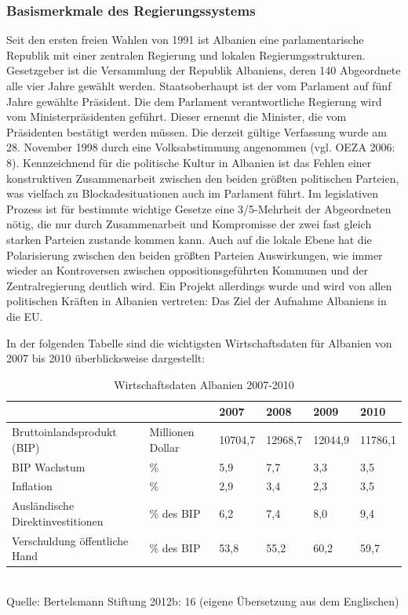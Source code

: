 \subsubsection{Basismerkmale des Regierungssystems}
Seit den ersten freien Wahlen von 1991 ist Albanien eine parlamentarische Republik mit einer zentralen Regierung und lokalen Regierungsstrukturen. Gesetzgeber ist die Versammlung der Republik Albaniens, deren 140 Abgeordnete alle vier Jahre gewählt werden. Staatsoberhaupt ist der vom Parlament auf fünf Jahre gewählte Präsident. Die dem Parlament verantwortliche Regierung wird vom Ministerpräsidenten geführt. Dieser ernennt die Minister, die vom Präsidenten bestätigt werden müssen. Die derzeit gültige Verfassung wurde am 28. November 1998 durch eine Volksabstimmung angenommen (vgl. OEZA 2006: 8). Kennzeichnend für die politische Kultur in Albanien ist das Fehlen einer konstruktiven Zusammenarbeit zwischen den beiden größten politischen Parteien, was vielfach zu Blockadesituationen auch im Parlament führt. Im legislativen Prozess ist für bestimmte wichtige Gesetze eine 3/5-Mehrheit der Abgeordneten nötig, die nur durch Zusammenarbeit und Kompromisse der zwei fast gleich starken Parteien zustande kommen kann. Auch auf die lokale Ebene hat die Polarisierung zwischen den beiden größten Parteien Auswirkungen, wie immer wieder an Kontroversen zwischen oppositionsgeführten Kommunen und der Zentralregierung deutlich wird. Ein Projekt allerdings wurde und wird von allen politischen Kräften in Albanien vertreten: Das Ziel der Aufnahme Albaniens in die EU.\par
In der folgenden Tabelle sind die wichtigsten Wirtschaftsdaten für Albanien von 2007 bis 2010 überblicksweise dargestellt:
\begin{table}[H]
\caption{Wirtschaftsdaten Albanien 2007-2010}
\small{
\begin{tabular}{|R{46mm}|R{25mm}|R{15mm}|R{15mm}|R{15mm}|R{15mm}|}\hline
&&2007&2008&2009&2010\\\hline
Bruttoinlandsprodukt (BIP)&
Millionen Dollar&10704,7&12968,7&12044,9&11786,1\\\hline
BIP Wachstum&\%&5,9&7,7&3,3&3,5\\\hline
Inflation &\%&2,9&3,4&2,3&3,5\\\hline
Ausländische Direktinvestitionen &\% des BIP&6,2&7,4&8,0&9,4\\\hline
Verschuldung öffentliche Hand&\% des BIP&53,8&55,2&60,2&59,7\\\hline
\end{tabular}\\
Quelle: Bertelsmann Stiftung 2012b: 16 (eigene Übersetzung aus dem Englischen)
}\end{table}

